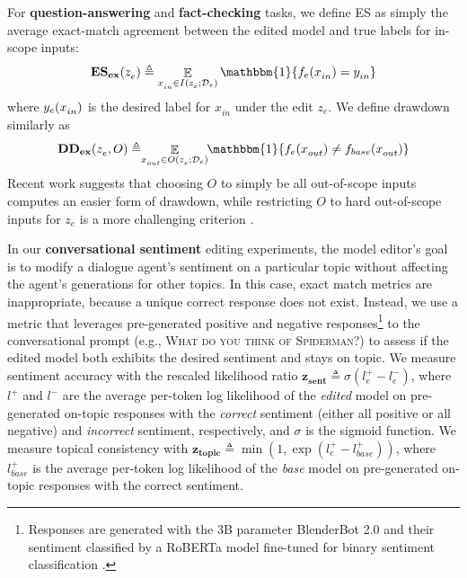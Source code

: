 \documentclass{article}
\newcommand{\basemodel}{f_{base}}
\newcommand{\editedmodel}{f_{e}}
\newcommand{\editdata}{\mathcal{D}_{e}}
\newcommand{\rawstring}[1]{\textsc{\footnotesize #1}}
\newcommand{\ze}[1][]{z_e^{#1}}
\newcommand{\ye}[1][]{\ifthenelse{\equal{#1}{}}{y_e}{y_e(#1)}}
\newcommand{\xloc}[1][]{x_{out}^{#1}}
\newcommand{\xtest}[1][]{x_{in}^{#1}}
\newcommand{\ytest}[1][]{y_{in}^{#1}}
\DeclareMathOperator*{\E}{\mathbb{E}}
\begin{document}
For \textbf{question-answering} and \textbf{fact-checking} tasks, we define ES as simply the average exact-match agreement between the edited model and true labels for in-scope inputs:
\begin{equation}
    \mathbf{ES_{ex}}(\ze) \triangleq \E_{\xtest \in I(\ze; \editdata)} \mathbbm{1}\{\editedmodel(\xtest) = \ytest\}
\end{equation}
where $\ye[\xtest]$ is the desired label for $\xtest$ under the edit $\ze$.
We define drawdown similarly as
\begin{equation}
    \mathbf{DD_{ex}}(\ze,O) \triangleq \hspace{-1mm}\E_{\xloc \in O(\ze; \editdata)}\hspace{-1mm} \mathbbm{1}\{\editedmodel(\xloc) \neq \basemodel(\xloc)\}
\end{equation}
Recent work suggests that choosing $O$ to simply be all out-of-scope inputs computes an easier form of drawdown, while restricting $O$ to hard out-of-scope inputs for $\ze$ is a more challenging criterion \citep{hase2021language}.

In our \textbf{conversational sentiment} editing experiments, the model editor's goal is to modify a dialogue agent's sentiment on a particular topic without affecting the agent's generations for other topics. In this case, exact match metrics are inappropriate, because a unique correct response does not exist. Instead, we use a metric that leverages pre-generated positive and negative responses\footnote{Responses are generated with the 3B parameter BlenderBot 2.0 \citep{roller2021recipes} and their sentiment classified by a RoBERTa model fine-tuned for binary sentiment classification \citep{heitmann2020}.} to the conversational prompt (e.g., \rawstring{What do you think of Spiderman?}) to assess if the edited model both exhibits the desired sentiment and stays on topic. We measure sentiment accuracy with the rescaled likelihood ratio $\mathbf{z_{sent}} \triangleq \sigma(l_e^+ - l_e^-)$, where $l^+$ and $l^-$ are the average per-token log likelihood of the \textit{edited} model on pre-generated on-topic responses with the \textit{correct} sentiment (either all positive or all negative) and \textit{incorrect} sentiment, respectively, and $\sigma$ is the sigmoid function. We measure topical consistency with $\mathbf{z_{topic}} \triangleq \min\left(1, \exp(l_e^+ - l_{base}^+)\right)$, where $l_{base}^+$ is the average per-token log likelihood of the \textit{base} model on pre-generated on-topic responses with the correct sentiment.
\end{document}
